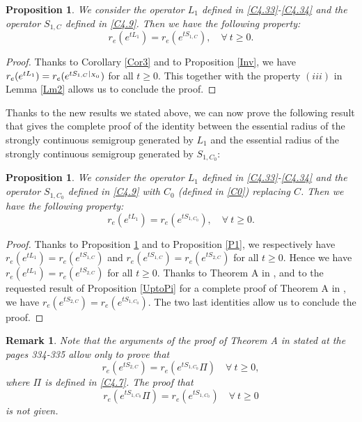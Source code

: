 \documentclass[10pt, english]{article}
\newtheorem{prop}[thm]{Proposition}
\newtheorem{oss}[thm]{Remark}
\begin{document}
{\begin{prop}\label{P2}
We consider the operator $L_1$ defined in \eqref{C4.33}-\eqref{C4.34} and the operator $S_{1,C}$ defined in \eqref{C4.9}. Then we have the following property:
\begin{equation}\label{C4.50}%
r_e(e^{tL_1})=r_e(e^{tS_{1,C}}), \quad \forall \ t \geqslant 0.
\end{equation}
\end{prop}
\begin{proof}
Thanks to Corollary \ref{Cor3} and to Proposition \ref{Inv}, we have $r_e(e^{tL_1})=r_e(e^{tS_{1,C}\small{|}_{X_0}})$ for all $t \geqslant 0$. This together with the property $(iii)$ in Lemma \ref{Lm2} allows us to conclude the proof.
\end{proof}
Thanks to the new results we stated above, we can now prove the following result that gives the complete proof of the identity between the essential radius of the strongly continuous semigroup generated by $L_1$ and the essential radius of the strongly continuous semigroup generated by $S_{1,C_0}$:
\begin{prop}\label{P2C0}
We consider the operator $L_1$ defined in \eqref{C4.33}-\eqref{C4.34} and the operator $S_{1,C_0}$ defined in \eqref{C4.9} with $C_0$ (defined in \eqref{C0}) replacing $C$. Then we have the following property:
\begin{equation}\label{C4.51}%
r_e(e^{tL_1})=r_e(e^{tS_{1,C_0}}), \quad \forall \ t \geqslant 0.
\end{equation}
\end{prop}
\begin{proof}
Thanks to Proposition \ref{P2} and to Proposition \ref{P1}, we respectively have $r_e(e^{tL_1})=r_e(e^{tS_{1,C}})$  and $r_e(e^{tS_{1,C}})=r_e(e^{tS_{2,C}})$ for all $t \geqslant 0$. Hence we have
$r_e(e^{tL_1})=r_e(e^{tS_{2,C}})$ for all $t \geqslant 0$. Thanks to Theorem A in \cite{NRL1986}, and to the requested result of Proposition \ref{UptoPi} for a complete proof of Theorem A in
\cite{NRL1986}, we have $r_e(e^{tS_{2,C}})=r_e(e^{tS_{1,C_0}})$.  The two last identities  allow us to conclude the proof.
\end{proof}
\begin{oss}\label{ThmA}
Note that the arguments of the proof of Theorem A in \cite{NRL1986} stated at the pages 334-335 allow only to prove that 
$$
r_e(e^{tS_{2,C}})=r_e(e^{tS_{1,C_0}}\Pi) \quad \forall \ t \geqslant 0,
$$
where $\Pi$ is defined in \eqref{C4.7}. The proof that 
$$
r_e(e^{tS_{1,C_0}}\Pi) = r_e(e^{tS_{1,C_0}}) \quad \forall \ t \geqslant 0
$$
is not given. 


\end{oss}}
\end{document}
